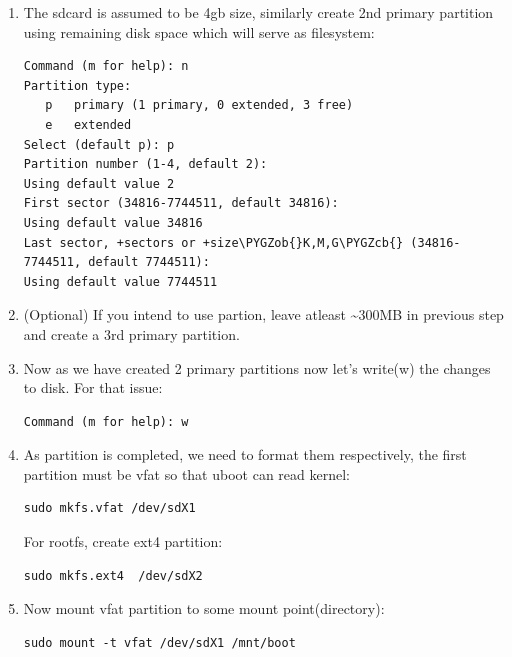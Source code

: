 \documentclass[letterpaper,10pt,english]{sphinxmanual}
\def\PYGZob{\char`\{}
\def\PYGZcb{\char`\}}
\begin{document}
\begin{enumerate}
\item {} 
The sdcard is assumed to be 4gb size, similarly create 2nd primary partition
using remaining disk space which will serve as filesystem:

\begin{Verbatim}[commandchars=\\\{\}]
Command (m for help): n
Partition type:
   p   primary (1 primary, 0 extended, 3 free)
   e   extended
Select (default p): p
Partition number (1-4, default 2):
Using default value 2
First sector (34816-7744511, default 34816):
Using default value 34816
Last sector, +sectors or +size\PYGZob{}K,M,G\PYGZcb{} (34816-7744511, default 7744511):
Using default value 7744511
\end{Verbatim}

\item {} 
(Optional) If you intend to use  partion, leave atleast \textasciitilde{}300MB in
previous step and create a 3rd primary partition.

\item {} 
Now as we have created 2 primary partitions now let's write(w) the changes
to disk. For that issue:

\begin{Verbatim}[commandchars=\\\{\}]
Command (m for help): w
\end{Verbatim}

\item {} 
As partition is completed, we need to format them respectively, the first
partition must be vfat so that uboot can read kernel:

\begin{Verbatim}[commandchars=\\\{\}]
sudo mkfs.vfat /dev/sdX1
\end{Verbatim}

For rootfs, create ext4 partition:

\begin{Verbatim}[commandchars=\\\{\}]
sudo mkfs.ext4  /dev/sdX2
\end{Verbatim}

\item {} 
Now mount vfat partition to some mount point(directory):

\begin{Verbatim}[commandchars=\\\{\}]
sudo mount -t vfat /dev/sdX1 /mnt/boot
\end{Verbatim}


\end{enumerate}
\end{document}
